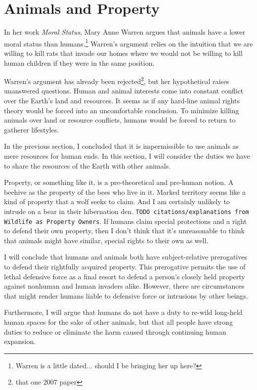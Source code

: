 \documentclass[12pt]{book}
\begin{document}
\chapter{Animals and Property}

    In her work \emph{Moral Status}, Mary Anne Warren argues that animals have
    a lower moral status than humans.\footnote{Warren is a little dated...
    should I be bringing her up here?} Warren's argument relies on the intuition
    that we are willing to kill rats that invade our homes where we would not
    be willing to kill human children if they were in the same position.
    
    Warren's argument has already been rejected\footnote{that one 2007 paper},
    but her hypothetical raises unanswered questions. Human and animal interests
    come into constant conflict over the Earth's land and resources. It seems as
    if any hard-line animal rights theory would be forced into an uncomfortable
    conclusion. To minimize killing animals over land or resource
    conflicts, humans would be forced to return to gatherer lifestyles.
    
    In the previous section, I concluded that it is impermissible to use
    animals as mere resources for human ends. In this section, I will consider
    the duties we have to share the resources of the Earth with other animals.

	Property, or something like it, is a pre-theoretical and pre-human notion.
	A beehive as the property of the bees who live in it.  Marked territory
	seems like a kind of property that a wolf seeks to claim.  And I am
	certainly unlikely to intrude on a bear in their hibernation den.
	\texttt{TODO citations/explanations from Wildlife as Property Owners}.  If
	humans claim special protections and a right to defend their own property,
	then I don’t think that it’s unreasonable to think that animals might have
	similar, special rights to their own as well.
    
    I will conclude that humans and animals both have subject-relative 
    prerogatives to defend their rightfully acquired property. This prerogative
    permits the use of lethal defensive force as a final resort to defend
    a person's closely held property against nonhuman and human invaders alike.
    However, there are circumstances that might render humans liable to 
	defensive force or intrusions by other beings.
	
    Furthermore, I will argue that humans do not have a duty to re-wild
    long-held human spaces for the sake of other animals, but that all people
    have strong duties to reduce or eliminate the harm caused through
    continuing human expansion.
    
\end{document}
